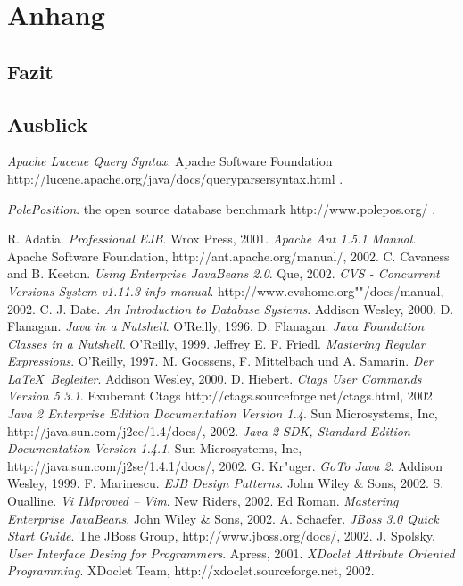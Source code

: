 
\chapter{Anhang}
\section{Fazit}
\section{Ausblick}



\begin{thebibliography}{keine ah}

\bibitem[LucQS]{} \emph{Apache Lucene Query Syntax}. Apache Software Foundation http://lucene.apache.org/java/docs/queryparsersyntax.html .

\bibitem[PolPos]{} \emph{PolePosition}. the open source database benchmark http://www.polepos.org/ .

\bibitem[Ada01]{} R. Adatia. \emph{Professional EJB}. Wrox Press, 2001.
\bibitem[Apa02]{} \emph{Apache Ant 1.5.1 Manual}. Apache Software Foundation, http://ant.apache.org/manual/, 2002.
\bibitem[Cav02]{} C. Cavaness and B. Keeton. \emph{Using Enterprise JavaBeans 2.0}. Que, 2002.
\bibitem[Cvs02]{} \emph{CVS - Concurrent Versions System v1.11.3 info manual}. http://www.cvshome.org""/docs/manual, 2002.
\bibitem[Dat00]{} C. J. Date. \emph{An Introduction to Database Systems}. Addison Wesley, 2000.
\bibitem[Fla96]{} D. Flanagan. \emph{Java in a Nutshell}. O'Reilly, 1996.
\bibitem[Fla99]{} D. Flanagan. \emph{Java Foundation Classes in a Nutshell}. O'Reilly, 1999.
\bibitem[Fri97]{} Jeffrey E. F. Friedl. \emph{Mastering Regular Expressions}. O'Reilly, 1997.
\bibitem[Goo00]{} M. Goossens, F. Mittelbach und A. Samarin. \emph{Der \LaTeX \ Begleiter}. Addison Wesley, 2000.
\bibitem[Hie02]{} D. Hiebert. \emph{Ctags User Commands Version 5.3.1}. Exuberant Ctags http://ctags.sourceforge.net/ctags.html, 2002
\bibitem[Jee02]{} \emph{Java 2 Enterprise Edition Documentation Version 1.4}.  Sun Microsystems, Inc, http://java.sun.com/j2ee/1.4/docs/, 2002.
\bibitem[Jse02]{} \emph{Java 2 SDK, Standard Edition Documentation Version 1.4.1}.  Sun Microsystems, Inc, http://java.sun.com/j2se/1.4.1/docs/, 2002.
\bibitem[Kr"u99]{} G. Kr"uger. \emph{GoTo Java 2}. Addison Wesley, 1999.
\bibitem[Mar02]{} F. Marinescu. \emph{EJB Design Patterns}. John Wiley \& Sons, 2002.
\bibitem[Oua02]{} S. Oualline. \emph{Vi IMproved -- Vim}. New Riders, 2002.
\bibitem[Rom02]{} Ed Roman. \emph{Mastering Enterprise JavaBeans}. John Wiley \& Sons, 2002.
\bibitem[Sch02]{} A. Schaefer. \emph{JBoss 3.0 Quick Start Guide}. The JBoss Group, http://www.jboss.org/docs/, 2002.
\bibitem[Spo01]{} J. Spolsky. \emph{User Interface Desing for Programmers}. Apress, 2001.
\bibitem[Xdo02]{} \emph{XDoclet Attribute Oriented Programming}. XDoclet Team, http://xdoclet.sourceforge.net, 2002.
\end{thebibliography}

